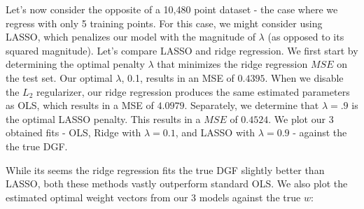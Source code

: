 \documentclass[10pt]{article}
\begin{document}
Let's now consider the opposite of a 10,480 point dataset - the case where we regress with only 5  training points. For this case, we might consider using LASSO, which penalizes our model with the magnitude of $\lambda$ (as opposed to its squared magnitude). Let's compare LASSO and ridge regression. We first start by determining the optimal penalty $\lambda$ that minimizes the ridge regression $MSE$ on the test set. Our optimal $\lambda$, 0.1, results in an MSE of $0.4395$. When we disable the $L_2$ regularizer, our ridge regression produces the same estimated parameters as OLS, which results in a MSE of $4.0979$. Separately, we determine that $\lambda = .9$ is the optimal LASSO penalty. This results in a $MSE$ of $0.4524$. We plot our 3 obtained fits - OLS, Ridge with $\lambda=0.1$, and LASSO with $\lambda=0.9$ - against the the true DGF.

While its seems the ridge regression fits the true DGF slightly better than LASSO, both these methods vastly outperform standard OLS. We also plot the estimated optimal weight vectors from our 3 models against the true $w$:
\end{document}
